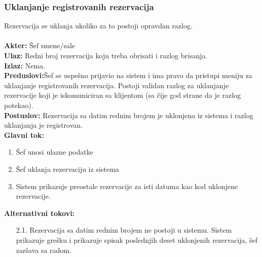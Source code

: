 \documentclass{article}
\begin{document}
\subsubsection{Uklanjanje registrovanih rezervacija}
Rezervacija se uklanja ukoliko za to postoji opravdan razlog.\\\\
\textbf{Akter:} Šef smene/sale\\
\textbf{Ulaz:} Redni broj rezervacija koju treba obrisati i razlog brisanja.\\
\textbf{Izlaz:} Nema.\\
\textbf{Preduslovi:}Šef se uspešno prijavio na sistem i ima pravo da pristupi meniju za uklanjanje registrovanih rezervacija. Postoji validan razlog za uklanjanje rezervacije koji je iskomuniciran sa klijentom (sa čije god strane da je razlog potekao).\\
\textbf{Postuslov:} Rezervacija sa datim rednim brojem je uklonjena iz sistema i razlog uklanjanja je registrovan.\\
\textbf{Glavni tok:}
\begin{enumerate}
\item Šef unosi ulazne podatke
\item Šef uklanja rezervaciju iz sistema
\item Sistem prikazuje preostale rezervacije za isti datuma kao kod uklonjene rezervacije.\\
\end{enumerate}
\textbf{Alternativni tokovi:}\\
\begin{itemize}
\item [2.1.] Rezervacija sa datim rednim brojem ne postoji u sistemu. Sistem prikazuje grešku i prikazuje spisak poslednjih deset uklonjenih rezervacija, šef zaršava sa radom.
\end{itemize}
\end{document}
